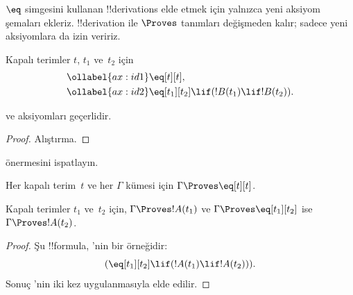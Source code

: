 



$\eq$ simgesini kullanan !!{derivation}s elde etmek için yalnızca yeni aksiyom
şemaları ekleriz. !!{derivation} ile $\Proves$ tanımları değişmeden kalır;
sadece yeni aksiyomlara da izin veririz.

\begin{defn}
Kapalı terimler $t$, $t_1$ ve~$t_2$ için
\begin{align}
\ollabel{ax:id1} & \eq[t][t], \\
\ollabel{ax:id2} & \eq[t_1][t_2] \lif (!B(t_1) \lif !B(t_2)).
\end{align}
\end{defn}

\begin{prop}
   ve  aksiyomları geçerlidir.
\end{prop}

\begin{proof}
  Alıştırma.
\end{proof}

\begin{prob}
 önermesini ispatlayın.
\end{prob}

\begin{prop}
 Her kapalı terim~$t$ ve her $\Gamma$ kümesi için $\Gamma \Proves \eq[t][t]$.
\end{prop}

\begin{prop}
  Kapalı terimler $t_1$ ve~$t_2$ için, $\Gamma \Proves !A(t_1)$ ve
  $\Gamma \Proves \eq[t_1][t_2]$ ise
  $\Gamma \Proves !A(t_2)$.
\end{prop}

\begin{proof}
Şu !!{formula}, 'nin bir örneğidir:
\[
(\eq[t_1][t_2] \lif (!A(t_1) \lif !A(t_2))).
\]
Sonuç \MP{}'nin iki kez uygulanmasıyla elde edilir.
\end{proof}

